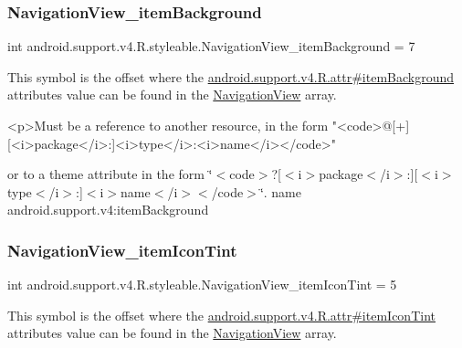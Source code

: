 \subsubsection{\texorpdfstring{Navigation\+View\+\_\+item\+Background}{NavigationView\_itemBackground}}
{\footnotesize\ttfamily int android.\+support.\+v4.\+R.\+styleable.\+Navigation\+View\+\_\+item\+Background = 7\hspace{0.3cm}{\ttfamily [static]}}

This symbol is the offset where the \hyperlink{classandroid_1_1support_1_1v4_1_1R_1_1attr_aa406a89c6cbd17dba970776ae457d426}{android.\+support.\+v4.\+R.\+attr\#item\+Background} attribute\textquotesingle{}s value can be found in the \hyperlink{classandroid_1_1support_1_1v4_1_1R_1_1styleable_a6e99b86cbaa0c61ca7598c15df537789}{Navigation\+View} array.

\begin{DoxyVerb}      <p>Must be a reference to another resource, in the form "<code>@[+][<i>package</i>:]<i>type</i>:<i>name</i></code>"
\end{DoxyVerb}
 or to a theme attribute in the form \char`\"{}$<$code$>$?\mbox{[}$<$i$>$package$<$/i$>$\+:\mbox{]}\mbox{[}$<$i$>$type$<$/i$>$\+:\mbox{]}$<$i$>$name$<$/i$>$$<$/code$>$\char`\"{}.  name android.\+support.\+v4\+:item\+Background \mbox{\label{classandroid_1_1support_1_1v4_1_1R_1_1styleable_a66c3c759347c63fdcb441cb6933140c5}} 
\subsubsection{\texorpdfstring{Navigation\+View\+\_\+item\+Icon\+Tint}{NavigationView\_itemIconTint}}
{\footnotesize\ttfamily int android.\+support.\+v4.\+R.\+styleable.\+Navigation\+View\+\_\+item\+Icon\+Tint = 5\hspace{0.3cm}{\ttfamily [static]}}

This symbol is the offset where the \hyperlink{classandroid_1_1support_1_1v4_1_1R_1_1attr_a3a30b4e249ac1ab4d8711bf25d85e0fe}{android.\+support.\+v4.\+R.\+attr\#item\+Icon\+Tint} attribute\textquotesingle{}s value can be found in the \hyperlink{classandroid_1_1support_1_1v4_1_1R_1_1styleable_a6e99b86cbaa0c61ca7598c15df537789}{Navigation\+View} array.

